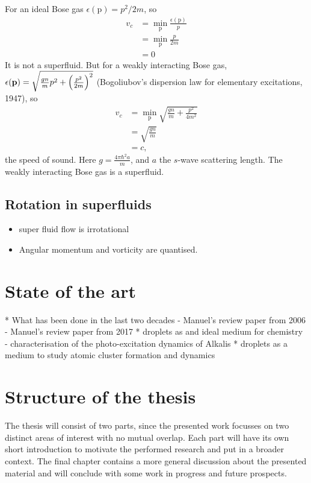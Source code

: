 \documentclass[11pt,a4paper,twoside]{article}
\renewcommand{\vec}[1]{\bm{\mathrm{#1}}}
\begin{document}
			For an ideal Bose gas $\epsilon(\vec{p})=p^2/2m$, so 
			\begin{align}
				v_c &= \min_{\vec{p}}\frac{\epsilon(\vec{p})}{p} \\
					&= \min_{\vec{p}}\frac{p}{2m} \\
					&= 0
			\end{align}
			It is not a superfluid. But for a weakly interacting Bose gas, $\epsilon(\vec{p})=\sqrt{\frac{gn}{m}p^2+\qty(\frac{p^2}{2m})^2}$ (Bogoliubov's dispersion law for elementary excitations, 1947), so
			\begin{align}
				v_c &=\min_{\vec{p}}\sqrt{\frac{gn}{m}+\frac{p^2}{4m^2}} \\
					&= \sqrt{\frac{gn}{m}} \\
					&= c,
			\end{align}
			the speed of sound. Here $g=\frac{4\pi\hbar^2a}{m}$, and $a$ the $s$-wave scattering length. The weakly interacting Bose gas is a superfluid.	
			
		\subsection{Rotation in superfluids}
			\begin{itemize}
				\item super fluid flow is irrotational
				\item Angular momentum and vorticity are quantised.
			\end{itemize}
			
	\section{State of the art}
		* What has been done in the last two decades
			- Manuel's review paper from 2006
			- Manuel's review paper from 2017
		* droplets as and ideal medium for chemistry
			- characterisation of the photo-excitation dynamics of Alkalis
		* droplets as a medium to study atomic cluster formation and dynamics
		
	\section{Structure of the thesis}
		The thesis will consist of two parts, since the presented work focusses on two distinct areas of interest with no mutual overlap. Each part will have its own short introduction to motivate the performed research and put in a broader context. The final chapter contains a more general discussion about the presented material and will conclude with some work in progress and future prospects.
\end{document}
